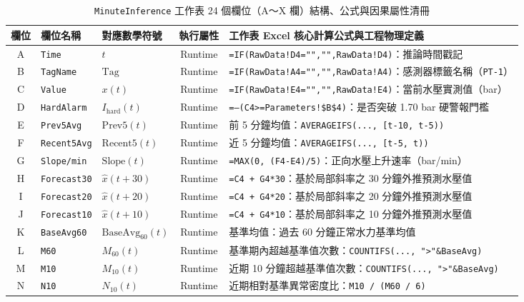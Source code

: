 \documentclass[fontset=none, a4paper, 12pt]{ctexart}
\begin{document}
\begin{doublespace}
\begin{table}[H]
\centering
\caption{\texttt{MinuteInference} 工作表 24 個欄位（A～X 欄）結構、公式與因果屬性清冊}
\label{tab:excel_minute_inference}
\scriptsize
\renewcommand{\arraystretch}{1.2}
\setlength{\tabcolsep}{2.5pt}
\begin{tabularx}{\textwidth}{cllcX}
\toprule
\textbf{欄位} & \textbf{欄位名稱} & \textbf{對應數學符號} & \textbf{執行屬性} & \textbf{工作表 Excel 核心計算公式與工程物理定義} \\
\midrule
A & \texttt{Time} & $t$ & Runtime & \texttt{=IF(RawData!D4="","",RawData!D4)}：推論時間戳記 \\
B & \texttt{TagName} & $\mathrm{Tag}$ & Runtime & \texttt{=IF(RawData!A4="","",RawData!A4)}：感測器標籤名稱（\texttt{PT-1}） \\
C & \texttt{Value} & $x(t)$ & Runtime & \texttt{=IF(RawData!E4="","",RawData!E4)}：當前水壓實測值（bar） \\
D & \texttt{HardAlarm} & $I_{\mathrm{hard}}(t)$ & Runtime & \texttt{=--(C4>=Parameters!\$B\$4)}：是否突破 1.70 bar 硬警報門檻 \\
E & \texttt{Prev5Avg} & $\mathrm{Prev5}(t)$ & Runtime & 前 5 分鐘均值：\texttt{AVERAGEIFS(..., [t-10, t-5))} \\
F & \texttt{Recent5Avg} & $\mathrm{Recent5}(t)$ & Runtime & 近 5 分鐘均值：\texttt{AVERAGEIFS(..., [t-5, t))} \\
G & \texttt{Slope/min} & $\mathrm{Slope}(t)$ & Runtime & \texttt{=MAX(0, (F4-E4)/5)}：正向水壓上升速率（bar/min） \\
H & \texttt{Forecast30} & $\hat{x}(t+30)$ & Runtime & \texttt{=C4 + G4*30}：基於局部斜率之 30 分鐘外推預測水壓值 \\
I & \texttt{Forecast20} & $\hat{x}(t+20)$ & Runtime & \texttt{=C4 + G4*20}：基於局部斜率之 20 分鐘外推預測水壓值 \\
J & \texttt{Forecast10} & $\hat{x}(t+10)$ & Runtime & \texttt{=C4 + G4*10}：基於局部斜率之 10 分鐘外推預測水壓值 \\
K & \texttt{BaseAvg60} & $\mathrm{BaseAvg}_{60}(t)$ & Runtime & 基準均值：過去 60 分鐘正常水力基準均值 \\
L & \texttt{M60} & $M_{60}(t)$ & Runtime & 基準期內超越基準值次數：\texttt{COUNTIFS(..., ">"\&BaseAvg)} \\
M & \texttt{M10} & $M_{10}(t)$ & Runtime & 近期 10 分鐘超越基準值次數：\texttt{COUNTIFS(..., ">"\&BaseAvg)} \\
N & \texttt{N10} & $N_{10}(t)$ & Runtime & 近期相對基準異常密度比：\texttt{M10 / (M60 / 6)} \\

\end{tabularx}
\end{table}
\end{doublespace}
\end{document}

